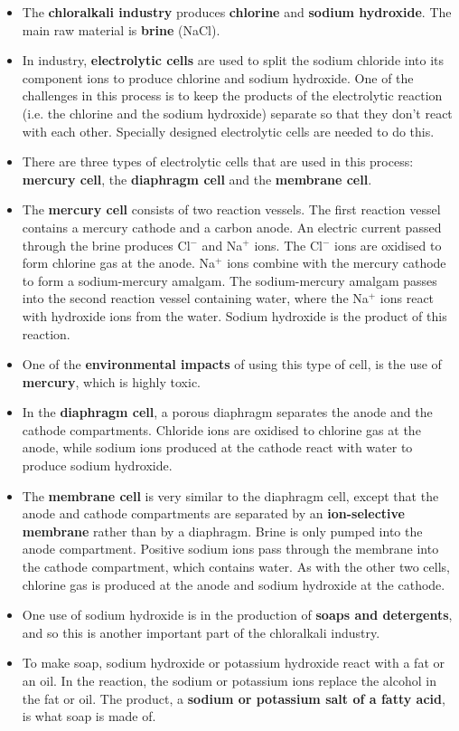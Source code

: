\begin{itemize}
\item{The \textbf{chloralkali industry} produces \textbf{chlorine} and \textbf{sodium hydroxide}. The main raw material is \textbf{brine} (NaCl).}
\item{In industry, \textbf{electrolytic cells} are used to split the sodium chloride into its component ions to produce chlorine and sodium hydroxide. One of the challenges in this process is to keep the products of the electrolytic reaction (i.e. the chlorine and the sodium hydroxide) separate so that they don't react with each other. Specially designed electrolytic cells are needed to do this.}
\item{There are three types of electrolytic cells that are used in this process: \textbf{mercury cell}, the \textbf{diaphragm cell} and the \textbf{membrane cell}.}
\item{The \textbf{mercury cell} consists of two reaction vessels. The first reaction vessel contains a mercury cathode and a carbon anode. An electric current passed through the brine produces Cl$^{-}$ and Na$^{+}$ ions. The Cl$^{-}$ ions are oxidised to form chlorine gas at the anode. Na$^{+}$ ions combine with the mercury cathode to form a sodium-mercury amalgam.  The sodium-mercury amalgam passes into the second reaction vessel containing water, where the Na$^{+}$ ions react with hydroxide ions from the water. Sodium hydroxide is the product of this reaction.}
\item{One of the \textbf{environmental impacts} of using this type of cell, is the use of \textbf{mercury}, which is highly toxic.}
\item{In the \textbf{diaphragm cell}, a porous diaphragm separates the anode and the cathode compartments. Chloride ions are oxidised to chlorine gas at the anode, while sodium ions produced at the cathode react with water to produce sodium hydroxide.}
\item{The \textbf{membrane cell} is very similar to the diaphragm cell, except that the anode and cathode compartments are separated by an \textbf{ion-selective membrane} rather than by a diaphragm. Brine is only pumped into the anode compartment. Positive sodium ions pass through the membrane into the cathode compartment, which contains water. As with the other two cells, chlorine gas is produced at the anode and sodium hydroxide at the cathode.}
\item{One use of sodium hydroxide is in the production of \textbf{soaps and detergents}, and so this is another important part of the chloralkali industry.}
\item{To make soap, sodium hydroxide or potassium hydroxide react with a fat or an oil. In the reaction, the sodium or potassium ions replace the alcohol in the fat or oil. The product, a \textbf{sodium or potassium salt of a fatty acid}, is what soap is made of.}

\end{itemize}
